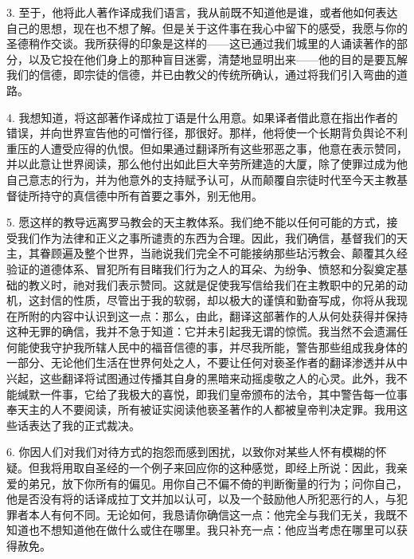 3. 至于，他将此人著作译成我们语言，我从前既不知道他是谁，或者他如何表达自己的思想，现在也不想了解。但是关于这件事在我心中留下的感受，我愿与你的圣德稍作交谈。我所获得的印象是这样的——这已通过我们城里的人诵读著作的部分，以及它投在他们身上的那种盲目迷雾，清楚地显明出来——他的目的是要瓦解我们的信德，即宗徒的信德，并已由教父的传统所确认，通过将我们引入弯曲的道路。\par

4. 我想知道，将这部著作译成拉丁语是什么用意。如果译者借此意在指出作者的错误，并向世界宣告他的可憎行径，那很好。那样，他将使一个长期背负舆论不利重压的人遭受应得的仇恨。但如果通过翻译所有这些邪恶之事，他意在表示赞同，并以此意让世界阅读，那么他付出如此巨大辛劳所建造的大厦，除了使罪过成为他自己意志的行为，并为他意外的支持赋予认可，从而颠覆自宗徒时代至今天主教基督徒所持守的真信德中所有首要之事外，别无他用。\par

5. 愿这样的教导远离罗马教会的天主教体系。我们绝不能以任何可能的方式，接受我们作为法律和正义之事所谴责的东西为合理。因此，我们确信，基督我们的天主，其眷顾遍及整个世界，当祂说我们完全不可能接纳那些玷污教会、颠覆其久经验证的道德体系、冒犯所有目睹我们行为之人的耳朵、为纷争、愤怒和分裂奠定基础的教义时，祂对我们表示赞同。这就是促使我写信给我们在主教职中的兄弟的动机，这封信的性质，尽管出于我的软弱，却以极大的谨慎和勤奋写成，你将从我现在所附的内容中认识到这一点：那么，由此，翻译这部著作的人从何处获得并保持这种无罪的确信，我并不急于知道：它并未引起我无谓的惊慌。我当然不会遗漏任何能使我守护我所辖人民中的福音信德的事，并尽我所能，警告那些组成我身体的一部分、无论他们生活在世界何处之人，不要让任何对亵圣作者的翻译渗透并从中兴起，这些翻译将试图通过传播其自身的黑暗来动摇虔敬之人的心灵。此外，我不能缄默一件事，它给了我极大的喜悦，即我们皇帝颁布的法令，其中警告每一位事奉天主的人不要阅读，所有被证实阅读他亵圣著作的人都被皇帝判决定罪。我用这些话表达了我的正式裁决。\par

6. 你因人们对我们对待方式的抱怨而感到困扰，以致你对某些人怀有模糊的怀疑。但我将用取自圣经的一个例子来回应你的这种感觉，即经上所说：因此，我亲爱的弟兄，放下你所有的偏见。用你自己不偏不倚的判断衡量的行为；问你自己，他是否没有将的话译成拉丁文并加以认可，以及一个鼓励他人所犯恶行的人，与犯罪者本人有何不同。无论如何，我恳请你确信这一点：他完全与我们无关，我既不知道也不想知道他在做什么或住在哪里。我只补充一点：他应当考虑在哪里可以获得赦免。\par

